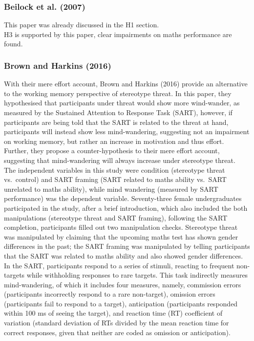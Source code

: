 \documentclass[
  stu,floatsintext]{apa7}
\begin{document}
\subsubsection{Beilock et al. (2007)}\label{beilockstereotypethreatworking2007-1}

This paper was already discussed in the H1 section.\\
H3 is supported by this paper, clear impairments on maths performance are found.

\subsubsection{Brown and Harkins (2016)}\label{brownthreatdoesnot2016}

With their mere effort account, Brown and Harkins (2016) provide an alternative to the working memory perspective of stereotype threat.
In this paper, they hypothesised that participants under threat would show more wind-wander, as measured by the Sustained Attention to Response Task (SART), however, if participants are being told that the SART is related to the threat at hand, participants will instead show less mind-wandering, suggesting not an impairment on working memory, but rather an increase in motivation and thus effort.
Further, they propose a counter-hypothesis to their mere effort account, suggesting that mind-wandering will always increase under stereotype threat.\\
The independent variables in this study were condition (stereotype threat vs.~control) and SART framing (SART related to maths ability vs.~SART unrelated to maths ability), while mind wandering (measured by SART performance) was the dependent variable.
Seventy-three female undergraduates participated in the study, after a brief introduction, which also included the both manipulations (stereotype threat and SART framing), following the SART completion, participants filled out two manipulation checks.
Stereotype threat was manipulated by claiming that the upcoming maths test has shown gender differences in the past; the SART framing was manipulated by telling participants that the SART was related to maths ability and also showed gender differences.
In the SART, participants respond to a series of stimuli, reacting to frequent non-targets while withholding responses to rare targets.
This task indirectly measures mind-wandering, of which it includes four measures, namely, commission errors (participants incorrectly respond to a rare non-target), omission errors (participants fail to respond to a target), anticipation (participants responded within 100 ms of seeing the target), and reaction time (RT) coefficient of variation (standard deviation of RTs divided by the mean reaction time for correct responses, given that neither are coded as omission or anticipation).
\end{document}
